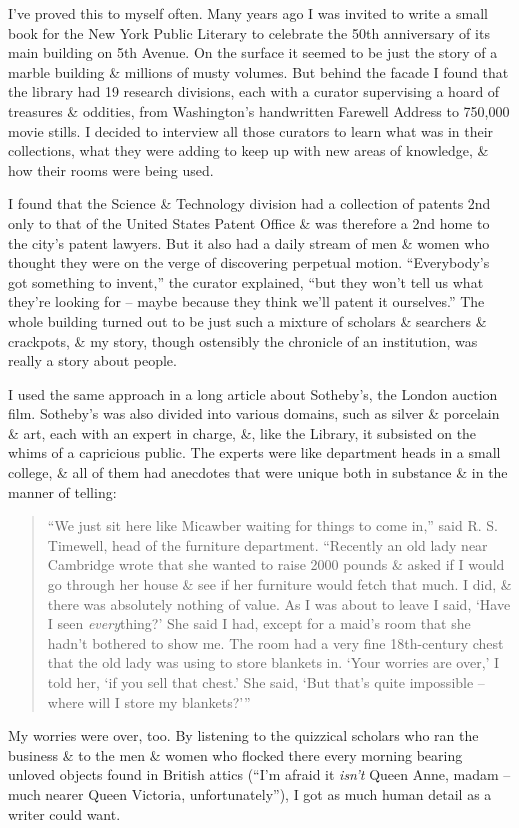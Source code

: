 \documentclass{article}
\begin{document}
I've proved this to myself often. Many years ago I was invited to write a small book for the New York Public Literary to celebrate the 50th anniversary of its main building on 5th Avenue. On the surface it seemed to be just the story of a marble building \& millions of musty volumes. But behind the facade I found that the library had 19 research divisions, each with a curator supervising a hoard of treasures \& oddities, from Washington's handwritten Farewell Address to 750,000 movie stills. I decided to interview all those curators to learn what was in their collections, what they were adding to keep up with new areas of knowledge, \& how their rooms were being used.

I found that the Science \& Technology division had a collection of patents 2nd only to that of the United States Patent Office \& was therefore a 2nd home to the city's patent lawyers. But it also had a daily stream of men \& women who thought they were on the verge of discovering perpetual motion. ``Everybody's got something to invent,'' the curator explained, ``but they won't tell us what they're looking for -- maybe because they think we'll patent it ourselves.'' The whole building turned out to be just such a mixture of scholars \& searchers \& crackpots, \& my story, though ostensibly the chronicle of an institution, was really a story about people.

I used the same approach in a long article about Sotheby's, the London auction film. Sotheby's was also divided into various domains, such as silver \& porcelain \& art, each with an expert in charge, \&, like the Library, it subsisted on the whims of a capricious public. The experts were like department heads in a small college, \& all of them had anecdotes that were unique both in substance \& in the manner of telling:
\begin{quotation}
	``We just sit here like Micawber waiting for things to come in,'' said R. S. Timewell, head of the furniture department. ``Recently an old lady near Cambridge wrote that she wanted to raise 2000 pounds \& asked if I would go through her house \& see if her furniture would fetch that much. I did, \& there was absolutely nothing of value. As I was about to leave I said, `Have I seen \textit{every}thing?' She said I had, except for a maid's room that she hadn't bothered to show me. The room had a very fine 18th-century chest that the old lady was using to store blankets in. `Your worries are over,' I told her, `if you sell that chest.' She said, `But that's quite impossible -- where will I store my blankets?'''
\end{quotation}
My worries were over, too. By listening to the quizzical scholars who ran the business \& to the men \& women who flocked there every morning bearing unloved objects found in British attics (``I'm afraid it \textit{isn't} Queen Anne, madam -- much nearer Queen Victoria, unfortunately''), I got as much human detail as a writer could want.
\end{document}
